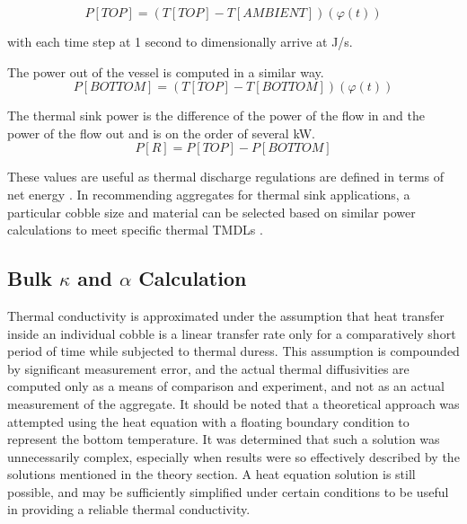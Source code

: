 \begin{equation}\label{pin}
P[TOP]=\left(T[TOP]-T[AMBIENT]\right)\left(\varphi (t)\right)
\end{equation}

\noindent with each time step at 1 second to dimensionally arrive at J/s.

\noindent The power out of the vessel is computed in a similar way.
\begin{equation}\label{pout}
P[BOTTOM]=\left(T[TOP]-T[BOTTOM]\right)\left(\varphi (t)\right)
\end{equation}

\noindent The thermal sink power is the difference of the power of the flow in and the power of the flow out and is on the order of several kW. 
\begin{equation}\label{tsp}
P[R]=P[TOP]-P[BOTTOM]
\end{equation}

These values are useful as thermal discharge regulations are defined in terms of net energy \citep{EPA}. In recommending aggregates for thermal sink applications, a particular cobble size and material can be selected based on similar power calculations to meet specific thermal TMDLs \citep{urban}.

\subsection{Bulk $\kappa$ and $\alpha$ Calculation}
Thermal conductivity is approximated under the assumption that heat transfer inside an individual cobble is a linear transfer rate only for a comparatively short period of time while subjected to thermal duress. This assumption is compounded by significant measurement error, and the actual thermal diffusivities are computed only as a means of comparison and experiment, and not as an actual measurement of the aggregate. It should be noted that a theoretical approach was attempted using the heat equation with a floating boundary condition to represent the bottom temperature. It was determined that such a solution was unnecessarily complex, especially when results were so effectively described by the solutions mentioned in the theory section. A heat equation solution is still possible, and may be sufficiently simplified under certain conditions to be useful in providing a reliable thermal conductivity.

